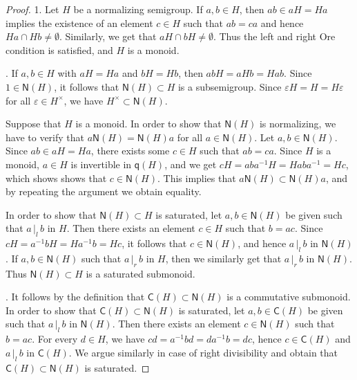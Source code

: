 \documentclass[a4paper]{amsart}
\theoremstyle{definition}
\numberwithin{equation}{section}
\begin{document}
\begin{proof}
1. Let $H$ be a normalizing semigroup. If $a, b \in H$, then $ab \in
aH = Ha$ implies the existence of an element $c \in H$ such that $ab
= ca$ and hence $Ha \cap Hb \ne \emptyset$. Similarly, we get that
$aH \cap bH \ne \emptyset$. Thus the left and right Ore condition is
satisfied, and $H$ is a monoid.

. If $a, b \in H$ with $aH = Ha$ and $bH = Hb$, then $abH = aHb =
Hab$. Since $1 \in \mathsf N (H)$, it follows that $\mathsf N (H)
\subset H$ is a subsemigroup. Since $\varepsilon H = H = H
\varepsilon$ for all $\varepsilon \in H^{\times}$, we have
$H^{\times} \subset \mathsf N (H)$.

Suppose that $H$ is a monoid. In order to show that $\mathsf N (H)$
is normalizing, we have to verify that $a \mathsf N (H) = \mathsf N
(H) a$ for all $a \in \mathsf N (H)$. Let $a, b \in \mathsf N (H)$.
Since $ab \in aH = Ha$, there exists some $c \in H$ such that $ab =
ca$. Since $H$ is a monoid, $a \in H$ is invertible in $\mathsf q
(H)$, and we get $cH = aba^{-1}H = H aba^{-1} = Hc$, which shows
shows that $c \in \mathsf N (H)$. This implies that $a \mathsf N(H)
\subset \mathsf N (H) a$, and by repeating the argument we obtain
equality.

In order to show that $\mathsf N (H) \subset H$ is saturated, let
$a, b \in \mathsf N (H)$ be given such that $a {\, |_l \,} b$ in $H$. Then
there exists an element $c \in H$ such that $b = ac$. Since $cH =
a^{-1}bH = H a^{-1}b = Hc$, it follows that $c \in \mathsf N (H)$,
and hence $a {\, |_l \,} b$ in $\mathsf N (H)$. If $a, b \in \mathsf N (H)$
such that $a {\, |_r \,} b$ in $H$, then we similarly get that $a {\, |_r \,} b$ in
$\mathsf N (H)$. Thus $\mathsf N (H) \subset H$ is a saturated
submonoid.

. It follows by the definition that $\mathsf C (H) \subset \mathsf N (H)$ is a commutative submonoid.
In order to show that $\mathsf C (H) \subset \mathsf N (H)$ is saturated, let
$a, b \in \mathsf C (H)$ be given such that $a {\, |_l \,} b$ in $\mathsf N (H)$. Then
there exists an element $c \in \mathsf N (H)$ such that $b = ac$. For every $d \in H$, we have
$c d = a^{-1}bd = d a^{-1}b = dc$, hence $c \in \mathsf C (H)$ and $a {\, |_l \,} b$ in $\mathsf C (H)$.
We argue similarly in case of right divisibility and obtain that $\mathsf C (H) \subset \mathsf N (H)$ is saturated.
\end{proof}
\end{document}
